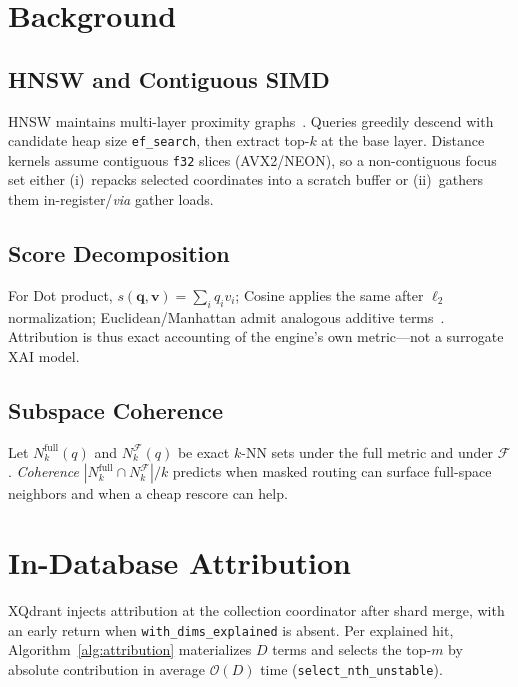 \documentclass[11pt,a4paper]{article}
\begin{document}
\section{Background}
\label{sec:background}

\subsection{HNSW and Contiguous SIMD}

HNSW maintains multi-layer proximity graphs~\cite{malkov2018hnsw}.
Queries greedily descend with candidate heap size \texttt{ef\_search}, then
extract top-$k$ at the base layer.
Distance kernels assume contiguous \texttt{f32} slices (AVX2/NEON), so a
non-contiguous focus set either (i)~repacks selected coordinates into a scratch
buffer or (ii)~gathers them in-register/\emph{via} gather loads.

\subsection{Score Decomposition}

For Dot product, $s(\mathbf{q},\mathbf{v})=\sum_i q_i v_i$; Cosine applies the
same after $\ell_2$ normalization; Euclidean/Manhattan admit analogous additive
terms~\cite{lundberg2017shap,ribeiro2016lime}.
Attribution is thus exact accounting of the engine's own metric---not a surrogate
XAI model.

\subsection{Subspace Coherence}

Let $N_k^{\mathrm{full}}(q)$ and $N_k^{\mathcal{F}}(q)$ be exact $k$-NN sets
under the full metric and under $\mathcal{F}$.
\emph{Coherence} $|N_k^{\mathrm{full}}\cap N_k^{\mathcal{F}}|/k$ predicts when
masked routing can surface full-space neighbors and when a cheap rescore can
help.

\section{In-Database Attribution}
\label{sec:attribution}

XQdrant injects attribution at the collection coordinator after shard merge,
with an early return when \texttt{with\_dims\_explained} is absent.
Per explained hit, Algorithm~\ref{alg:attribution} materializes $D$ terms and
selects the top-$m$ by absolute contribution in average $\mathcal{O}(D)$ time
(\texttt{select\_nth\_unstable}).
\end{document}
